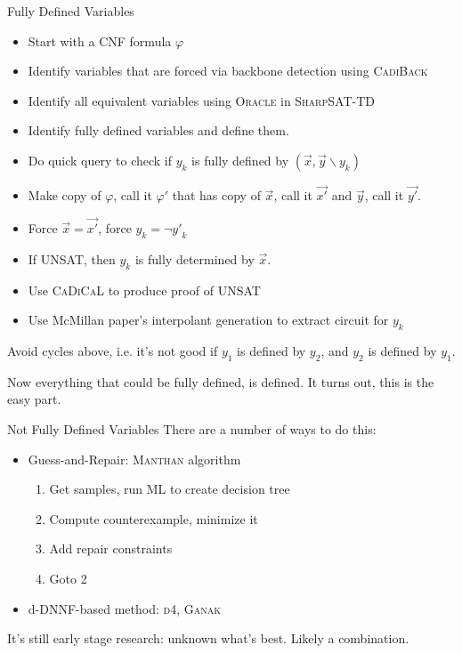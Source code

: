 \documentclass[aspectratio=169]{beamer}
\begin{document}
\begin{frame}{Fully Defined Variables}
\begin{itemize}
    \item Start with a CNF formula $ \varphi$
    \item Identify variables that are forced via backbone detection
        using \textsc{CadiBack}
    \item Identify all equivalent variables using \textsc{Oracle}
        in \textsc{SharpSAT-TD}
    \item Identify fully defined variables and define them.
\end{itemize}

\bigskip
\begin{itemize}
    \item Do quick query to check if $y_k$ is fully defined by $(\vec{x},
        \vec{y} \backslash y_k)$
    \item Make copy of $\varphi$, call it $\varphi'$ that has copy of
        $\vec{x}$, call it $\vec{x'}$ and $\vec{y}$, call it $\vec{y'}$.
    \item Force $\vec{x} = \vec{x'}$, force $y_k = \neg {y'}_k$
    \item If UNSAT, then $y_k$ is fully determined by $\vec{x}$.
    \item Use \textsc{CaDiCaL} to produce proof of UNSAT
    \item Use McMillan paper's interpolant generation to extract circuit for
        $y_k$
\end{itemize}
\bigskip
Avoid cycles above, i.e. it's not good if $y_1$ is defined by $y_2$, and $y_2$
is defined by $y_1$.
\bigskip

Now everything that could be fully defined, is defined. It turns out, this is
the easy part.
\end{frame}

\begin{frame}{Not Fully Defined Variables}
There are a number of ways to do this:
\begin{itemize}
    \item Guess-and-Repair: \textsc{Manthan} algorithm
        \begin{enumerate}
            \item Get samples, run ML to create decision tree
            \item Compute counterexample, minimize it
            \item Add repair constraints
            \item Goto 2
        \end{enumerate}
    \item d-DNNF-based method: \textsc{d4}, \textsc{Ganak}
\end{itemize}
\bigskip

It's still early stage research: unknown what's best. Likely a combination.
\end{frame}
\end{document}
